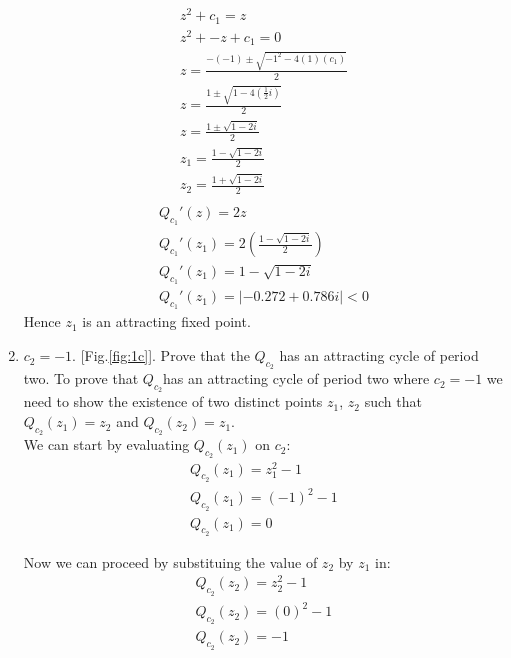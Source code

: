 \documentclass[11pt]{article}
\begin{document}
\begin{enumerate}[label=(\alph{*})]
    \begin{equation}
        \begin{split}
        z^2 + c_1 = z \\
        z^2 + -z + c_1 = 0 \\
        z=\frac{-\left(-1\right)\pm\sqrt{-1^2-4\left(1\right)\left(c_1\right)}}{2}\\
        z=\frac{1\pm\sqrt{1-4\left(\frac{1}{2}i\right)}}{2}\\
        z=\frac{1\pm\sqrt{1-2i}}{2}\\
        z_1=\frac{1-\sqrt{1-2i}}{2}\\
        z_2=\frac{1+\sqrt{1-2i}}{2}\\
        \end{split}
    \end{equation}
    \begin{equation}
        \begin{split}
            Q_{c_1}'(z) = 2z\\
            Q_{c_1}'(z_1) = 2 \left(\frac{1-\sqrt{1-2i}}{2}\right)\\
            Q_{c_1}'(z_1) = 1-\sqrt{1-2i}\\
            Q_{c_1}'(z_1) = |-0.272 + 0.786i| < 0
        \end{split}
    \end{equation}
    Hence $z_1$ is an attracting fixed point.
    \item $c_2 = -1$. [Fig.\ref{fig:1c}]. Prove that the $Q_{c_2}$ has an attracting cycle of period two.
    To prove that $Q_{c_2}$​ has an attracting cycle of period two where $c_2 = -1$ we need to show the existence of two distinct points $z_1$, $z_2$ such that $Q_{c_2}(z_1) = z_2$ and $Q_{c_2}(z_2) = z_1$.\\
    We can start by evaluating $Q_{c_2}(z_1)$ on $c_2$:
    \begin{equation}
        \begin{split}
            Q_{c_2}(z_1) = z^2_1 - 1\\
            Q_{c_2}(z_1) = (-1)^2 - 1\\
            Q_{c_2}(z_1) = 0
        \end{split}
    \end{equation}

    Now we can proceed by substituing the value of $z_2$ by $z_1$ in:
    \begin{equation}
        \begin{split}
            Q_{c_2}(z_2) = z^2_2 - 1\\
            Q_{c_2}(z_2) = (0)^2 - 1\\
            Q_{c_2}(z_2) = -1
        \end{split}
    \end{equation}


\end{enumerate}
\end{document}

